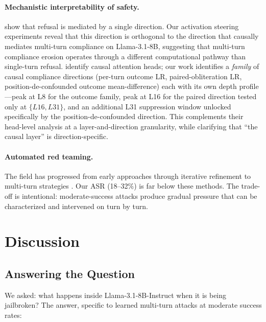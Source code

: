 \documentclass[11pt]{article}
\begin{document}
\paragraph{Mechanistic interpretability of safety.}
\citet{arditi2024refusal} show that refusal is mediated by a single direction.
Our activation steering experiments reveal that this direction is orthogonal to the direction that causally mediates multi-turn compliance on Llama-3.1-8B, suggesting that multi-turn compliance erosion operates through a different computational pathway than single-turn refusal.
\citet{park2026asguard} identify causal attention heads; our work identifies a \emph{family} of causal compliance directions (per-turn outcome LR, paired-obliteration LR, position-de-confounded outcome mean-difference) each with its own depth profile---peak at L8 for the outcome family, peak at L16 for the paired direction tested only at $\{L16, L31\}$, and an additional L31 suppression window unlocked specifically by the position-de-confounded direction. This complements their head-level analysis at a layer-and-direction granularity, while clarifying that ``the causal layer'' is direction-specific.

\paragraph{Automated red teaming.}
The field has progressed from early approaches \citep{perez2022redteaming} through iterative refinement \citep{chao2023pair} to multi-turn strategies \citep{russinovich2025crescendo, pavlova2024goat}.
Our ASR (18--32\%) is far below these methods.
The trade-off is intentional: moderate-success attacks produce gradual pressure that can be characterized and intervened on turn by turn.

\section{Discussion}
\label{sec:discussion}

\subsection{Answering the Question}

We asked: what happens inside Llama-3.1-8B-Instruct when it is being jailbroken?
The answer, specific to learned multi-turn attacks at moderate success rates:
\end{document}
